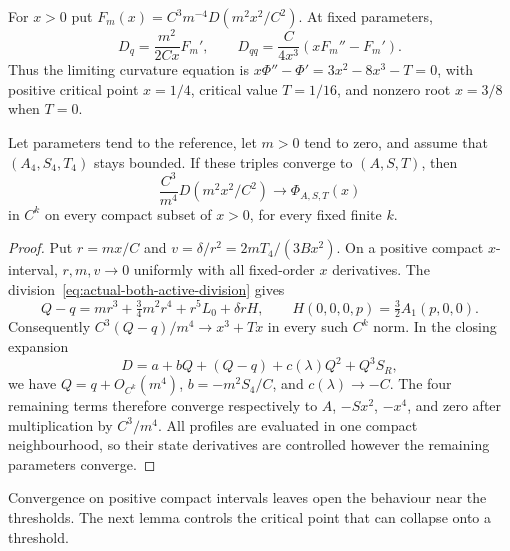 For $x>0$ put $F_m(x)=C^3m^{-4}D(m^2x^2/C^2)$. At fixed parameters,
\[
 D_q=\frac{m^2}{2Cx}F_m',\qquad
 D_{qq}=\frac{C}{4x^3}(xF_m''-F_m').
\]
Thus the limiting curvature equation is
$x\Phi''-\Phi'=3x^2-8x^3-T=0$, with positive critical point $x=1/4$,
critical value $T=1/16$, and nonzero root $x=3/8$ when $T=0$.

\begin{lemma}\label{lem:k4-sequence}
Let parameters tend to the reference, let $m>0$ tend to zero, and assume
that $(A_4,S_4,T_4)$ stays bounded. If these triples converge to $(A,S,T)$,
then
\[
 \frac{C^3}{m^4}D(m^2x^2/C^2)\longrightarrow\Phi_{A,S,T}(x)
\]
in $C^k$ on every compact subset of $x>0$, for every fixed finite $k$.
\end{lemma}
\begin{proof}
Put $r=mx/C$ and $v=\delta/r^2=2mT_4/(3Bx^2)$. On a positive compact
$x$-interval, $r,m,v\to0$ uniformly with all fixed-order $x$ derivatives.
The division~\eqref{eq:actual-both-active-division} gives
\[
 Q-q=mr^3+\tfrac34m^2r^4+r^5L_0+\delta rH,
 \qquad H(0,0,0,p)=\tfrac32A_1(p,0,0).
\]
Consequently $C^3(Q-q)/m^4\to x^3+Tx$ in every such $C^k$ norm.
In the closing expansion
\[
 D=a+bQ+(Q-q)+c(\lambda)Q^2+Q^3S_R,
\]
we have $Q=q+O_{C^k}(m^4)$, $b=-m^2S_4/C$, and $c(\lambda)\to-C$.
The four remaining terms therefore converge respectively to
$A$, $-Sx^2$, $-x^4$, and zero after multiplication by $C^3/m^4$.
All profiles are evaluated in one compact neighbourhood, so their state
derivatives are controlled however the remaining parameters converge.
\end{proof}

Convergence on positive compact intervals leaves open the behaviour near
the thresholds. The next lemma controls the critical point that can collapse
onto a threshold.

